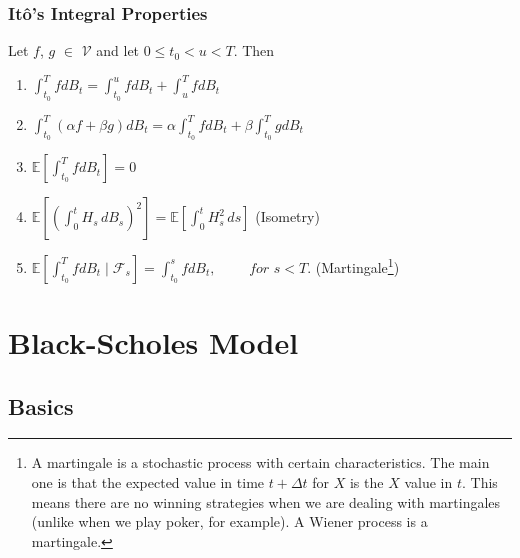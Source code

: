\documentclass[12pt,twoside]{reedthesis}
\theoremstyle{definition}
\theoremstyle{definition}
\theoremstyle{remark}
\begin{document}
  \subsubsection{Itô's Integral
  Properties}\label{itos-integral-properties}
  
  Let \(f\), \(g\) \(\in\) \(\mathcal{V}\) and let \(0 \leq t_0 < u < T\).
  Then
  \begin{enumerate}[label=(\roman*)]
    \item $\displaystyle \int_{t_0}^{T}{f dB_t} = \int_{t_0}^{u}{f dB_t} + \int_{u}^{T}{f dB_t}$
    \item $\displaystyle \int_{t_0}^{T}{(\alpha f + \beta g) dB_t} = \alpha  \int_{t_0}^{T}{f dB_t} + \beta  \int_{t_0}^{T}{g dB_t}$
    \item $\displaystyle \mathbb{E}\left[ \int_{t_0}^{T}{fdB_t}\right] = 0 $
    \item $\displaystyle \mathbb {E} \left[\left(\int_{0}^{t}H_{s}\,dB_{s}\right)^{2}\right]=\mathbb {E} \left[\int _{0}^{t}H_{s}^{2}\,ds\right]$ (Isometry)
    \item $ \displaystyle \mathbb {E}\left[ \int_{t_0}^{T}{f dB_t \mid \mathcal{F}_{s}} \right] = \int_{t_0}^{s}{f dB_t}, \,\,\,\,\,\,\,\,\,\,\,\,\,\, for \,\, s < T.$  (Martingale\footnote{A martingale is a stochastic process with certain characteristics. The main one is that the expected value in time $t+\Delta t$ for $X$ is the $X$ value in $t$. This means there are no winning strategies when we are dealing with martingales (unlike when we play poker, for example). A Wiener process is a martingale.})
  \end{enumerate}
  \section{Black-Scholes Model}\label{black-scholes-model}
  
  \subsection{Basics}\label{basics}
  
\end{document}
